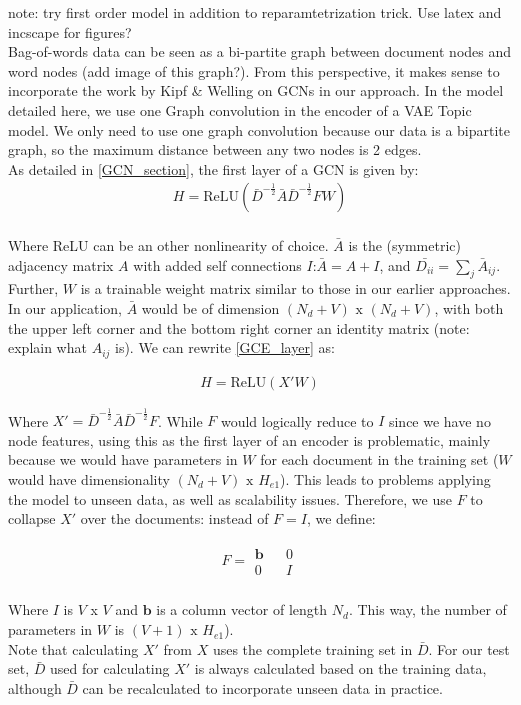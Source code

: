 \documentclass{report}
\begin{document}
note: try first order model in addition to reparamtetrization trick.  Use latex and incscape for figures?\\
Bag-of-words data can be seen as a bi-partite graph between document nodes and word nodes (add image of this graph?). From this perspective, it makes sense to incorporate the work by Kipf \& Welling on GCNs in our approach. In the model detailed here, we use one Graph convolution in the encoder of a VAE Topic model. We only need to use one graph convolution because our data is a bipartite graph, so the maximum distance between any two nodes is 2 edges. \\
As detailed in \ref{GCN_section}, the first layer of a GCN is given by:
\begin{align}\label{GCE_layer}
H = \text{ReLU}(\bar{D}^{-\frac{1}{2}}\bar{A}\bar{D}^{-\frac{1}{2}}FW)
\end{align}
\\
Where ReLU can be an other nonlinearity of choice. $\bar{A}$ is the (symmetric) adjacency matrix $A$ with added self connections $I$:$\bar{A} = A+I$, and $\bar{D_{ii}}=\sum_j\bar{A}_{ij}$. Further, $W$ is a trainable weight matrix similar to those in our earlier approaches. In our application, $\bar{A}$ would be of dimension $(N_d + V) \text{ x } (N_d + V)$, with both the upper left corner and the bottom right corner an identity matrix (note: explain what $A_{ij}$ is). We can rewrite \ref{GCE_layer} as:

\begin{align}\label{GCE_layer}
H = \text{ReLU}(X'W)
\end{align}

Where $X' = \bar{D}^{-\frac{1}{2}}\bar{A}\bar{D}^{-\frac{1}{2}}F$. While $F$ would logically reduce to $I$ since we have no node features, using this as the first layer of an encoder is problematic, mainly because we would have parameters in $W$ for each document in the training set ($W$ would have dimensionality $(N_d + V) \text{ x } H_{e1}$). This leads to problems applying the model to unseen data, as well as scalability issues. Therefore, we use $F$ to collapse $X'$ over the documents: instead of $F = I$, we define:

\begin{align}
{F} = 
\begin{matrix} 
\mathbf{b} && 0 \\
0 && I
\end{matrix}
\end{align}
\\
Where $I$ is $V$ x $V$ and $\mathbf{b}$ is a column vector of length $N_d$. This way, the number of parameters in $W$ is $( V + 1) \text{ x } H_{e1}$). \\
Note that calculating $X'$ from $X$ uses the complete training set in $\bar{D}$. For our test set, $\bar{D}$ used for calculating $X'$ is always calculated based on the training data, although $\bar{D}$ can be recalculated to incorporate unseen data in practice.
\end{document}
